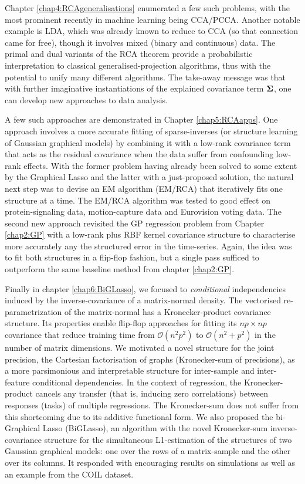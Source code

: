     Chapter \ref{chap4:RCAgeneralisations} enumerated a few such problems, with the most prominent recently in machine learning being CCA/PCCA.
    Another notable example is LDA, which was already known to reduce to CCA (so that connection came for free), though it involves mixed (binary and continuous) data.
    The primal and dual variants of the RCA theorem provide a probabilistic interpretation to classical generalised-projection algorithms, thus with the potential to unify many different algorithms.
    The take-away message was that with further imaginative instantiations of the explained covariance term $\mathbf{\Sigma}$, one can develop new approaches to data analysis.
    
    A few such approaches are demonstrated in Chapter \ref{chap5:RCAapps}.
    One approach involves a more accurate fitting of sparse-inverses (or structure learning of Gaussian graphical models) by combining it with a low-rank covariance term that acts as the residual covariance when the data suffer from confounding low-rank effects.
    With the former problem having already been solved to some extent by the Graphical Lasso and the latter with a just-proposed solution, the natural next step was to devise an EM algorithm (EM/RCA) that iteratively fits one structure at a time.
    The EM/RCA algorithm was tested to good effect on protein-signaling data, motion-capture data and Eurovision voting data.
    The second new approach revisited the GP regression problem from Chapter \ref{chap2:GP} with a low-rank plus RBF kernel covariance structure to characterise more accurately any the structured error in the time-series.
    Again, the idea was to fit both structures in a flip-flop fashion, but a single pass sufficed to outperform the same baseline method from chapter \ref{chap2:GP}.
    
    Finally in chapter \ref{chap6:BiGLasso}, we focused to \emph{conditional} independencies induced by the inverse-covariance of a matrix-normal density.
    The vectorised re-parametrization of the matrix-normal has a Kronecker-product covariance structure. Its properties enable flip-flop approaches for fitting its $np\times np$ covariance that reduce training time from $\mathcal{O}(n^2p^2)$ to $\mathcal{O}(n^2 + p^2)$ in the number of matrix dimensions.
    We motivated a novel structure for the joint precision, the Cartesian factorisation of graphs (Kronecker-sum of precisions), as a more parsimonious and interpretable structure for inter-sample and inter-feature conditional dependencies.
    In the context of regression, the Kronecker-product cancels any transfer (that is, inducing zero correlations) between responses (tasks) of multiple regressions.
    The Kronecker-sum does not suffer from this shortcoming due to its additive functional form.
    We also proposed the bi-Graphical Lasso (BiGLasso), an algorithm with the novel Kronecker-sum inverse-covariance structure for the simultaneous L1-estimation of the structures of two Gaussian graphical models: one over the rows of a matrix-sample and the other over its columns.
    It responded with encouraging results on simulations as well as an example from the COIL dataset.

